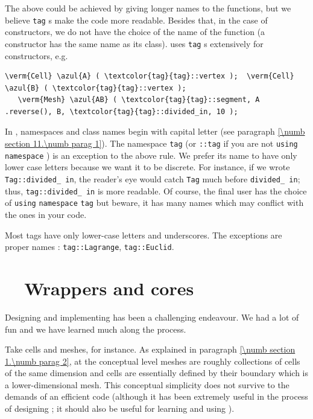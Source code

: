 The above could be achieved by giving longer names to the functions, but we believe
{\small\tt\textcolor{tag}{tag}}\hskip0.8pt s make the code more readable.
Besides that, in the case of constructors, we do not have the choice of the name of the function
(a constructor has the same name as its class).
{\ManiFEM} uses {\small\tt\textcolor{tag}{tag}}\hskip0.8pt s extensively for constructors, e.g.
\begin{Verbatim}[commandchars=\\\{\},formatcom=\small\tt,baselinestretch=0.94]
   \verm{Cell} \azul{A} ( \textcolor{tag}{tag}::vertex );  \verm{Cell} \azul{B} ( \textcolor{tag}{tag}::vertex );
   \verm{Mesh} \azul{AB} ( \textcolor{tag}{tag}::segment, A .reverse(), B, \textcolor{tag}{tag}::divided_in, 10 );
\end{Verbatim}

In \maniFEM, namespaces and class names begin with capital letter
(see paragraph \ref{\numb section 11.\numb parag 1}).
The namespace {\small\tt\textcolor{tag}{tag}} (or {\small\tt{}::tag} if you are not
{\small\tt using} {\small\tt namespace} {\small\tt{}}) is an exception
to the above rule.
We prefer its name to have only lower case letters because we want it to be
discrete. For instance, if we wrote {\small\tt\textcolor{tag}{Tag}::divided\_\,in},
the reader's eye would catch {\small\tt\textcolor{tag}{Tag}} much before
{\small\tt divided\_\,in};
thus, {\small\tt\textcolor{tag}{tag}::divided\_\,in} is more readable.
Of course, the final user has the choice of {\small\tt using} {\small\tt namespace}
{\small\tt\textcolor{tag}{tag}} but beware, it has many names which may conflict
with the ones in your code.

Most tags have only lower-case letters and underscores.
The exceptions are proper names : {\small\tt \textcolor{tag}{tag}::Lagrange},
{\small\tt \textcolor{tag}{tag}::Euclid}.


\section{~~Wrappers and cores}\label{\numb section 11.\numb parag 4}

Designing and implementing {\maniFEM} has been a challenging endeavour.
We had a lot of fun and we have learned much along the process.

Take cells and meshes, for instance.
As explained in paragraph \ref{\numb section 1.\numb parag 2}, at the conceptual level meshes
are roughly collections of cells of the same dimension and cells are essentially
defined by their boundary which is a lower-dimensional mesh.
This conceptual simplicity does not survive to the demands of an efficient code
(although it has been extremely useful in the process of designing \maniFEM;
it should also be useful for learning and using \maniFEM).

